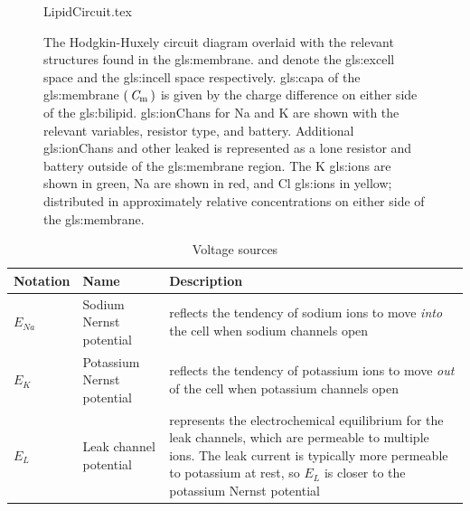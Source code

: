 \documentclass[class={myRUCProject}, crop=false]{standalone}
\begin{document}
\begin{figure}[H]
    \centering
    {LipidCircuit.tex}
    \caption{The Hodgkin-Huxely circuit diagram overlaid with the relevant structures found in the \gls{gls:membrane}.  and  denote the \gls{gls:excell} space and the \gls{gls:incell} space respectively. \Gls{gls:capa} of the \gls{gls:membrane} \(\left(\,\mathit{C}_\mathrm{m}\,\right)\) is given by the charge difference on either side of the \gls{gls:bilipid}. \Glspl{gls:ionChan} for  \gls{Na} and  \gls{K} are shown with the relevant variables, resistor type, and battery. Additional \glspl{gls:ionChan} and other leaked is represented as a lone resistor and battery outside of the \gls{gls:membrane} region. The \gls{K} \glspl{gls:ion} are shown in green,  \gls{Na} are shown in red, and  \gls{Cl} \glspl{gls:ion} in yellow; distributed in approximately relative concentrations on either side of the \gls{gls:membrane}.}\label{fig:MembraneCircut}
\end{figure}
\begin{table}[htb]
    \centering
    \caption{Voltage sources}\label{tab:voltagesources}
    \begin{tabular}{m{} @{}
                    m{}  @{}
                    m{}} \hline
        Notation & Name & Description \\\hline
$E_{Na}$ & Sodium Nernst potential & reflects the tendency of sodium ions to move \textit{into} the cell when sodium channels open \\
$E_K$ & Potassium Nernst potential & reflects the tendency of potassium ions to move \textit{out} of the cell when potassium channels open \\
$E_{L}$ & Leak channel potential & represents the electrochemical equilibrium for the leak channels, which are permeable to multiple ions. The leak current is typically more permeable to potassium at rest, so $E_L$ is closer to the potassium Nernst potential \\ \hline
\end{tabular}
\end{table}

\end{document}
